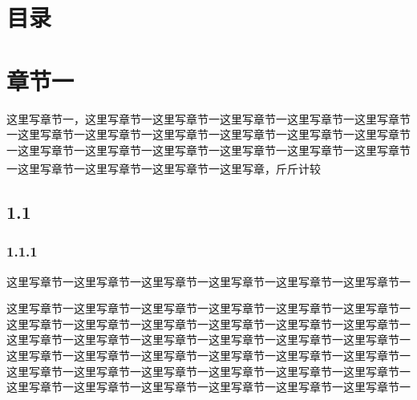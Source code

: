 \documentclass[UTF8,12pt,a4paper]{ctexart}
\newcommand{\upcite}[1]{\textsuperscript{\cite{#1}}}
\begin{document}
\section*{目录}
\vspace*{-6ex}
\renewcommand{\contentsname}{}
\begin{spacing}{1.1}
	\tableofcontents
\end{spacing}
\restoregeometry
\setcounter{page}{1}
\pagestyle{fancy}
\renewcommand{\headrulewidth}{0pt}
\fancyhead[L]{\textit{\leftmark}}
\fancyfoot[CO,CE]{\thepage}
\section{章节一}

这里写章节一，这里写章节一这里写章节一这里写章节一这里写章节一这里写章节一这里写章节一这里写章节一这里写章节一这里写章节一这里写章节一这里写章节一这里写章节一这里写章节一这里写章节一这里写章节一这里写章节一这里写章节一这里写章节一这里写章节一这里写章节一这里写章\upcite{karvelis2021transposonassociated,lucas2021impact,guomei2020jiyuhplcjiehehuaxuejiliangxueduihuangqinjingyezuijiacaishouqidepingjieyanjiu}，斤斤计较
\subsection{1.1}
\subsubsection{1.1.1}
这里写章节一这里写章节一这里写章节一这里写章节一这里写章节一这里写章节一

这里写章节一这里写章节一这里写章节一这里写章节一这里写章节一这里写章节一这里写章节一这里写章节一这里写章节一这里写章节一这里写章节一这里写章节一这里写章节一这里写章节一这里写章节一这里写章节一这里写章节一这里写章节一这里写章节一这里写章节一这里写章节一这里写章节一这里写章节一这里写章节一这里写章节一这里写章节一这里写章节一这里写章节一这里写章节一这里写章节一这里写章节一这里写章节一这里写章节一这里写章节一这里写章节一这里写章节一
\end{document}
